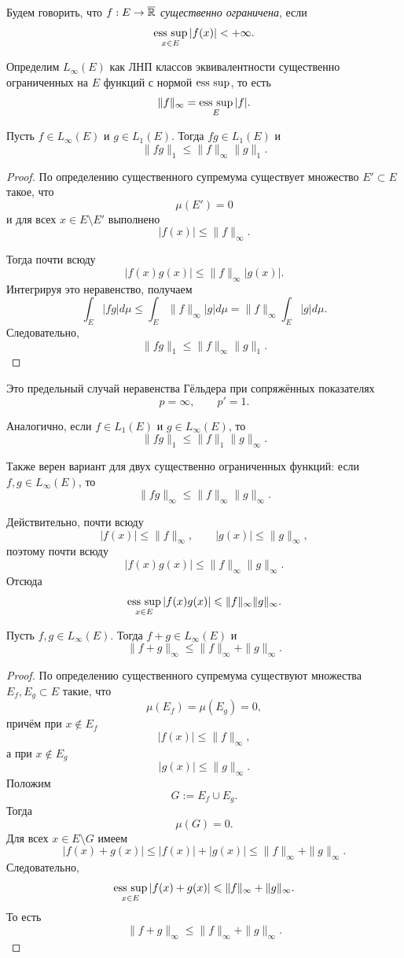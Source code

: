 \begin{definition}
    Будем говорить, что $f: E \to \overline{\mathbb{R}}$ \textit{существенно ограничена}, если
    \[\operatorname*{ess\ sup}\limits_{x \in E} |f(x)| < +\infty.\]
\end{definition} 

\begin{definition}
    Определим $L_\infty(E)$ как ЛНП классов эквивалентности существенно ограниченных на $E$ функций с нормой $\operatorname*{ess\ sup}$, то есть
    \[\|f\|_\infty = \operatorname*{ess\ sup}\limits_E |f|.\]
\end{definition} 

\begin{theorem}
    Пусть $f\in L_\infty(E)$ и $g\in L_1(E)$. Тогда $fg\in L_1(E)$ и
    \[\|fg\|_1 \le \|f\|_\infty \|g\|_1.\]
\end{theorem}
\begin{proof}
    По определению существенного супремума существует множество $E'\subset E$ такое, что
    \[\mu(E')=0\]
    и для всех $x\in E\setminus E'$ выполнено
    \[|f(x)|\leqslant \|f\|_\infty.\]

    Тогда почти всюду
    \[|f(x)g(x)|\leqslant \|f\|_\infty |g(x)|.\]
    Интегрируя это неравенство, получаем
    \[\int_E |f g| d\mu
    \leqslant
    \int_E \|f\|_\infty |g| d\mu
    =
    \|f\|_\infty \int_E |g| d\mu.\]
    Следовательно,
    \[\|fg\|_1\leqslant \|f\|_\infty\|g\|_1.\]
\end{proof}

Это предельный случай неравенства Гёльдера при сопряжённых показателях
\[p=\infty,\qquad p'=1.\]

Аналогично, если $f\in L_1(E)$ и $g\in L_\infty(E)$, то
\[\|fg\|_1\leqslant \|f\|_1\|g\|_\infty.\]

Также верен вариант для двух существенно ограниченных функций:
если $f,g\in L_\infty(E)$, то
\[\|fg\|_\infty\leqslant \|f\|_\infty\|g\|_\infty.\]

Действительно, почти всюду
\[
|f(x)|\leqslant \|f\|_\infty,
\qquad
|g(x)|\leqslant \|g\|_\infty,
\]
поэтому почти всюду
\[
|f(x)g(x)|
\leqslant
\|f\|_\infty\|g\|_\infty.
\]
Отсюда
\[
\operatorname*{ess\ sup}_{x\in E}|f(x)g(x)|
\leqslant
\|f\|_\infty\|g\|_\infty.
\]

\begin{theorem}
    Пусть $f,g\in L_\infty(E)$. Тогда $f+g\in L_\infty(E)$ и
    \[
    \|f+g\|_\infty
    \leqslant
    \|f\|_\infty+\|g\|_\infty.
    \]
\end{theorem}
\begin{proof}
    По определению существенного супремума существуют множества $E_f,E_g\subset E$ такие, что
    \[\mu(E_f)=\mu(E_g)=0,\]
    причём при $x\notin E_f$
    \[|f(x)|\leqslant \|f\|_\infty,\]
    а при $x\notin E_g$
    \[|g(x)|\leqslant \|g\|_\infty.\]
    Положим
    \[G:=E_f\cup E_g.\]
    Тогда
    \[\mu(G)=0.\]
    Для всех $x\in E\setminus G$ имеем
    \[
    |f(x)+g(x)|
    \leqslant
    |f(x)|+|g(x)|
    \leqslant
    \|f\|_\infty+\|g\|_\infty.
    \]
    Следовательно,
    \[
    \operatorname*{ess\ sup}_{x\in E}|f(x)+g(x)|
    \leqslant
    \|f\|_\infty+\|g\|_\infty.
    \]
    То есть
    \[
    \|f+g\|_\infty
    \leqslant
    \|f\|_\infty+\|g\|_\infty.
    \]
\end{proof}

